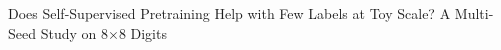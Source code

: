 Does Self-Supervised Pretraining Help with Few Labels at Toy Scale? A Multi-Seed Study on 8$\times$8 Digits
